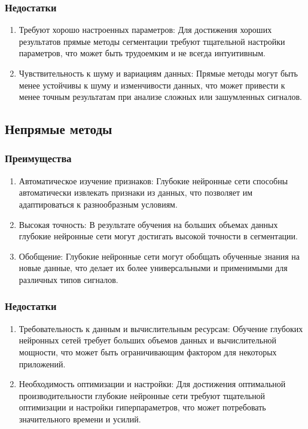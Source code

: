 \subsubsection{Недостатки}

\begin{enumerate}
	\item Требуют хорошо настроенных параметров: Для достижения хороших
	результатов прямые методы сегментации требуют тщательной настройки
	параметров, что может быть трудоемким и не всегда интуитивным.

	\item Чувствительность к шуму и вариациям данных: Прямые методы могут
	быть менее устойчивы к шуму и изменчивости данных, что может привести к
	менее точным результатам при анализе сложных или зашумленных сигналов.
\end{enumerate}

\subsection{Непрямые методы}
\subsubsection{Преимущества}

\begin{enumerate}
	\item Автоматическое изучение признаков: Глубокие нейронные сети
	способны автоматически извлекать признаки из данных, что позволяет им
	адаптироваться к разнообразным условиям.

	\item Высокая точность: В результате обучения на больших объемах данных
	глубокие нейронные сети могут достигать высокой точности в сегментации.

	\item Обобщение: Глубокие нейронные сети могут обобщать обученные
	знания на новые данные, что делает их более универсальными и
	применимыми для различных типов сигналов.
\end{enumerate}

\subsubsection{Недостатки}

\begin{enumerate}
	\item Требовательность к данным и вычислительным ресурсам: Обучение
	глубоких нейронных сетей требует больших объемов данных и
	вычислительной мощности, что может быть ограничивающим фактором для
	некоторых приложений.

	\item Необходимость оптимизации и настройки: Для достижения оптимальной
	производительности глубокие нейронные сети требуют тщательной
	оптимизации и настройки гиперпараметров, что может потребовать
	значительного времени и усилий.
\end{enumerate}

